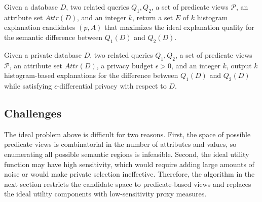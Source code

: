 \begin{definition}
Given a database $D$, two related queries $Q_1,Q_2$, a set of predicate views $\mathcal{P}$, an attribute set $Attr(D)$, and an integer $k$, return a set $E$ of $k$ histogram explanation candidates $(p,A)$ that maximizes the ideal explanation quality for the semantic difference between $Q_1(D)$ and $Q_2(D)$.
\end{definition}

\begin{definition}
Given a private database $D$, two related queries $Q_1,Q_2$, a set of predicate views $\mathcal{P}$, an attribute set $Attr(D)$, a privacy budget $\epsilon>0$, and an integer $k$, output $k$ histogram-based explanations for the difference between $Q_1(D)$ and $Q_2(D)$ while satisfying $\epsilon$-differential privacy with respect to $D$.
\end{definition}


\subsection{Challenges}
\label{subsec:model-challenges}

The ideal problem above is difficult for two reasons.
First, the space of possible predicate views is combinatorial in the number of attributes and values, so enumerating all possible semantic regions is infeasible.
Second, the ideal utility function may have high sensitivity, which would require adding large amounts of noise or would make private selection ineffective.
Therefore, the algorithm in the next section restricts the candidate space to predicate-based views and replaces the ideal utility components with low-sensitivity proxy measures.
